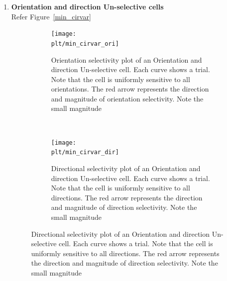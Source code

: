 \documentclass[11pt]{article}
\newcommand{\plt}{../../plots}
\newcommand{\rulesep}{\unskip\ \vrule\ }
\begin{document}
\begin{enumerate}
\begin{figure}
\begin{subfigure}{.48\textwidth}
        \end{subfigure}        
    \end{figure}
    \item \textbf{Orientation and direction Un-selective cells}\\
    Refer Figure~\ref{min_cirvar}
    \begin{figure}
        \centering
        \caption{Orientation and direction Un-selective cells}
        \label{min_cirvar}
        \begin{subfigure}{.48\textwidth}
            \centering
        \texttt{[image: \\plt/min\_cirvar\_ori]}
            \caption{Orientation selectivity plot of an Orientation and direction Un-selective cell. Each curve shows a trial. Note that the cell is uniformly sensitive to all orientations. The red arrow represents the direction and magnitude of orientation selectivity. Note the small magnitude}
        \end{subfigure}
        \rulesep
        \begin{subfigure}{.48\textwidth}
            \centering
            \texttt{[image: \\plt/min\_cirvar\_dir]}
            \caption{Directional selectivity plot of an Orientation and direction Un-selective cell. Each curve shows a trial. Note that the cell is uniformly sensitive to all directions. The red arrow represents the direction and magnitude of direction selectivity. Note the small magnitude}
        \end{subfigure}
    \end{figure}
\end{enumerate}

\FloatBarrier
\end{document}
